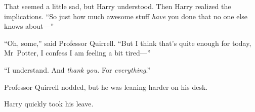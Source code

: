 That seemed a little sad, but Harry understood. Then Harry realized the implications. “So just how much awesome stuff \emph{have} you done that no one else knows about—”

“Oh, some,” said Professor Quirrell. “But I think that’s quite enough for today, Mr~Potter, I confess I am feeling a bit tired—”

“I understand. And \emph{thank you.} For \emph{everything}.”

Professor Quirrell nodded, but he was leaning harder on his desk.

Harry quickly took his leave.

